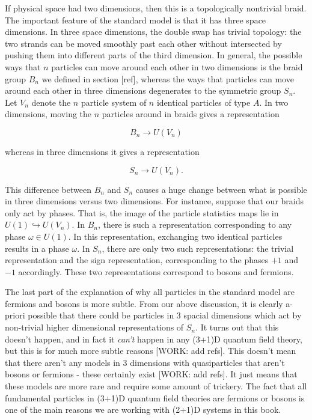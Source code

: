 \documentclass{article}
\theoremstyle{definition}
\newcommand{\0}{\left|0\right>}
\newcommand{\1}{\left|1\right>}
\numberwithin{figure}{section}
\begin{document}
If physical space had two dimensions, then this is a topologically nontrivial braid. The important feature of the standard model is that it has three space dimensions. In three space dimensions, the double swap has trivial topology: the two strands can be moved smoothly past each other without intersected by pushing them into different parts of the third dimension. In general, the possible ways that $n$ particles can move around each other in two dimensions is the braid group $B_n$ we defined in section [ref], whereas the ways that particles can move around each other in three dimensions degenerates to the symmetric group $S_n$. Let $V_n$ denote the $n$ particle system of $n$ identical particles of type $A$. In two dimensions, moving the $n$ particles around in braids gives a representation

$$B_n\xrightarrow{}U(V_n)$$

whereas in three dimensions it gives a representation

$$S_n\xrightarrow{}U(V_n).$$

This difference between $B_n$ and $S_n$ causes a huge change between what is possible in three dimensions versus two dimensions. For instance, suppose that our braids only act by phases. That is, the image of the particle statistics maps lie in $U(1)\hookrightarrow{}U(V_n)$. In $B_n$, there is such a representation corresponding to any phase $\omega\in U(1)$. In this representation, exchanging two identical particles results in a phase $\omega$. In $S_n$, there are only two such representations: the trivial representation and the sign representation, corresponding to the phases $+1$ and $-1$ accordingly. These two representations correspond to bosons and fermions.

The last part of the explanation of why all particles in the standard model are fermions and bosons is more subtle. From our above discussion, it is clearly a-priori possible that there could be particles in 3 spacial dimensions which act by non-trivial higher dimensional representations of $S_n$. It turns out that this doesn't happen, and in fact it \textit{can't} happen in any (3+1)D quantum field theory, but this is for much more subtle reasons [WORK: add refs]. This doesn't mean that there aren't any models in 3 dimensions with quasiparticles that aren't bosons or fermions - these certainly exist [WORK: add refs]. It just means that these models are more rare and require some amount of trickery. The fact that all fundamental particles in (3+1)D quantum field theories are fermions or bosons is one of the main reasons we are working with (2+1)D systems in this book.
\end{document}
